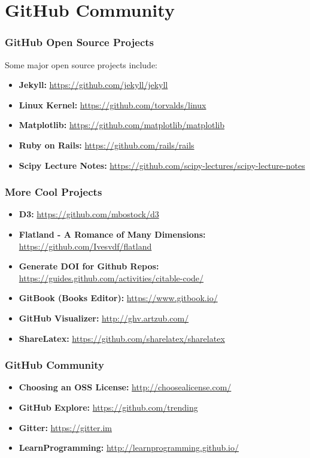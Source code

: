 
\section[GitHub Community]{GitHub Community}

\begin{frame}
\frametitle{GitHub Open Source Projects}
Some major open source projects include:
\begin{itemize}
\item \textbf{Jekyll:} \href{https://github.com/jekyll/jekyll}{https://github.com/jekyll/jekyll}
\item \textbf{Linux Kernel:} \href{https://github.com/torvalds/linux}{https://github.com/torvalds/linux}
\item \textbf{Matplotlib:} \href{https://github.com/matplotlib/matplotlib}{https://github.com/matplotlib/matplotlib}
\item \textbf{Ruby on Rails:} \href{https://github.com/rails/rails}{https://github.com/rails/rails}
\item \textbf{Scipy Lecture Notes:} \href{https://github.com/scipy-lectures/scipy-lecture-notes}{https://github.com/scipy-lectures/scipy-lecture-notes}
\end{itemize}
\end{frame}
\note{}

\begin{frame}
\frametitle{More Cool Projects}
\begin{itemize}
\item \textbf{D3:} \url{https://github.com/mbostock/d3}
\item \textbf{Flatland - A Romance of Many Dimensions:} \url{https://github.com/Ivesvdf/flatland}
\item \textbf{Generate DOI for Github Repos:} \url{https://guides.github.com/activities/citable-code/}
\item \textbf{GitBook (Books Editor):} \url{https://www.gitbook.io/}
\item \textbf{GitHub Visualizer:} \url{http://ghv.artzub.com/}
\item \textbf{ShareLatex:} \url{https://github.com/sharelatex/sharelatex}
\end{itemize}
\end{frame}
\note{}

\begin{frame}
\frametitle{GitHub Community}
\begin{itemize}
\item \textbf{Choosing an OSS License:} \url{http://choosealicense.com/}
\item \textbf{GitHub Explore:} \url{https://github.com/trending}
\item \textbf{Gitter:} \url{https://gitter.im}
\item \textbf{LearnProgramming:} \url{http://learnprogramming.github.io/}
\end{itemize}
\end{frame}
\note{}